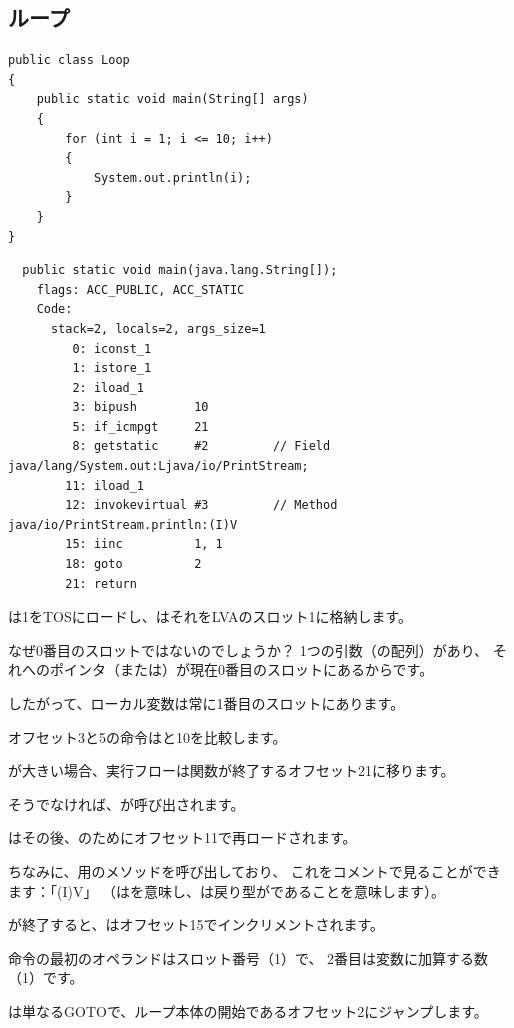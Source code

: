 \subsection{ループ}

\begin{lstlisting}[style=customjava]
public class Loop
{
	public static void main(String[] args)
	{ 
		for (int i = 1; i <= 10; i++)
		{
			System.out.println(i); 
		}               
	}
}
\end{lstlisting}

\begin{lstlisting}
  public static void main(java.lang.String[]);
    flags: ACC_PUBLIC, ACC_STATIC
    Code:
      stack=2, locals=2, args_size=1
         0: iconst_1      
         1: istore_1      
         2: iload_1       
         3: bipush        10
         5: if_icmpgt     21
         8: getstatic     #2         // Field java/lang/System.out:Ljava/io/PrintStream;
        11: iload_1       
        12: invokevirtual #3         // Method java/io/PrintStream.println:(I)V
        15: iinc          1, 1
        18: goto          2
        21: return        
\end{lstlisting}

は1を\ac{TOS}にロードし、はそれを\ac{LVA}のスロット1に格納します。

なぜ0番目のスロットではないのでしょうか？
1つの引数（の配列）があり、
それへのポインタ（または）が現在0番目のスロットにあるからです。

したがって、ローカル変数は常に1番目のスロットにあります。

オフセット3と5の命令はと10を比較します。

が大きい場合、実行フローは関数が終了するオフセット21に移ります。

そうでなければ、が呼び出されます。

はその後、のためにオフセット11で再ロードされます。

ちなみに、用のメソッドを呼び出しており、
これをコメントで見ることができます：「(I)V」
（はを意味し、は戻り型がであることを意味します）。

が終了すると、はオフセット15でインクリメントされます。

命令の最初のオペランドはスロット番号（1）で、
2番目は変数に加算する数（1）です。

は単なるGOTOで、ループ本体の開始であるオフセット2にジャンプします。

